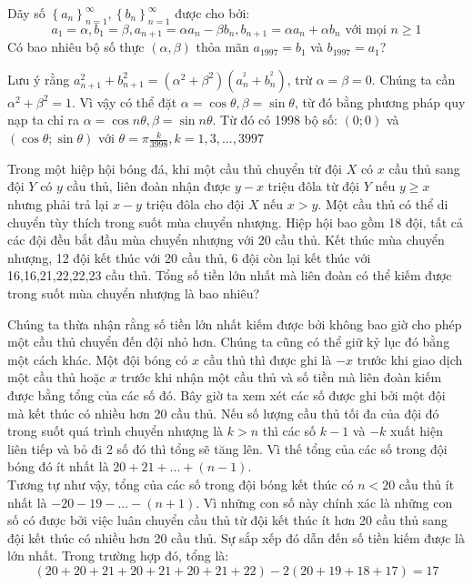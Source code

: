 \begin{baitap}
Dãy số $\left\{ {a_n } \right\}_{n = 1}^\infty  ,\left\{ {b_n } \right\}_{n = 1}^\infty  $  được cho bởi:
$$ a_1  = \alpha ,b_1  = \beta ,a_{n + 1}  = \alpha a_n  - \beta b_n ,b_{n + 1}  = \alpha a_n  + \alpha b_n  \text{ với mọi }  n \ge 1$$ 
Có bao nhiêu bộ số thực $\left( {\alpha ,\beta } \right)$ thỏa mãn $a_{1997}  = b_1 $ và $b_{1997}  = a_1 $?

\begin{loigiai5}
Lưu ý rằng $a_{n + 1}^2  + b_{n + 1}^2  = \left( {\alpha ^2  + \beta ^2 } \right)\left( {a_n^{^2 }  + b_n^{^2 } } \right)$, trừ $\alpha  = \beta  = 0$. Chúng ta cần $\alpha ^2  + \beta ^2  = 1$. Vì vậy có thể đặt $\alpha  = \cos \theta ,\beta  = \sin \theta $, từ đó bằng phương pháp quy nạp ta chỉ ra $\alpha  = \cos n \theta ,\beta  = \sin n \theta $. Từ đó có 1998 bộ số: $\left( {0;0} \right)$ và $\left( {\cos \theta ;\sin \theta } \right)$ với $\theta  = \pi \frac{k}{{3998}},k = 1,3,...,3997$
\end{loigiai5}
\end{baitap}

\begin{baitap}
Trong một hiệp hội bóng đá, khi một cầu thủ chuyển từ đội $X$ có $x$ cầu thủ sang đội $Y$ có $y$ cầu thủ, liên đoàn nhận được $y-x$ triệu đôla từ đội $Y$ nếu $y \ge x$ nhưng phải trả lại $x-y$ triệu đôla cho đội $X$ nếu $x>y$. Một cầu thủ có thể di chuyển tùy thích trong suốt mùa chuyển nhượng. Hiệp hội bao gồm 18 đội, tất cả các đội đều bắt đầu mùa chuyển nhượng với 20 cầu thủ. Kết thúc mùa chuyển nhượng, 12 đội kết thúc với 20 cầu thủ, 6 đội còn lại kết thúc với 16,16,21,22,22,23 cầu thủ. Tổng số tiền lớn nhất mà liên đoàn có thể kiếm được trong suốt mùa chuyển nhượng là bao nhiêu?

\begin{loigiai5}
Chúng ta thừa nhận rằng số tiền lớn nhất kiếm được bởi không bao giờ cho phép một cầu thủ chuyển đến đội nhỏ hơn. Chúng ta cũng có thể giữ kỷ lục đó bằng một cách khác. Một đội bóng có $x$ cầu thủ thì được ghi là $-x$ trước khi giao dịch một cầu thủ hoặc $x$ trước khi nhận một cầu thủ và số tiền mà liên đoàn kiếm được bằng tổng của các số đó. Bây giờ ta xem xét các số được ghi bởi một đội  mà kết thúc có nhiều hơn 20 cầu thủ. Nếu số lượng cầu thủ tối đa của đội đó trong suốt quá trình chuyển nhượng là $k>n$  thì các số $k-1$ và $-k$ xuất hiện liên tiếp và bỏ đi 2 số đó thì tổng sẽ tăng lên. Vì thế tổng của các số trong đội bóng đó ít nhất là $20+21+...+(n-1)$.\\
Tương tự như vậy, tổng của các số trong đội bóng kết thúc có $n<20$ cầu thủ ít nhất là $-20-19-...-(n+1)$. Vì những con số này chính xác là những con số có được bởi việc luân chuyển cầu thủ từ đội kết thúc ít hơn 20 cầu thủ sang đội kết thúc có nhiều hơn 20 cầu thủ. Sự sắp xếp đó dẫn đến số tiền kiếm được là lớn nhất. Trong trường hợp đó, tổng là:
$$ (20+20+21+20+21+20+21+22) -2(20+19+18+17)=17$$
\end{loigiai5}
\end{baitap}

